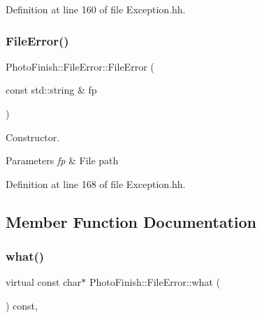 Definition at line 160 of file Exception.\+hh.

\mbox{\label{class_photo_finish_1_1_file_error_a4646f633f8b6383a52147cedacf3cf1d}} 
\subsubsection{\texorpdfstring{File\+Error()}{FileError()}\hspace{0.1cm}{\footnotesize\ttfamily [2/2]}}
{\footnotesize\ttfamily Photo\+Finish\+::\+File\+Error\+::\+File\+Error (\begin{DoxyParamCaption}\item[{const std\+::string \&}]{fp }\end{DoxyParamCaption})\hspace{0.3cm}{\ttfamily [inline]}}



Constructor. 


\begin{DoxyParams}{Parameters}
{\em fp} & File path \\
\hline
\end{DoxyParams}


Definition at line 168 of file Exception.\+hh.



\subsection{Member Function Documentation}
\mbox{\label{class_photo_finish_1_1_file_error_ac4da80387c770aa95858dae8aac9a81e}} 
\subsubsection{\texorpdfstring{what()}{what()}}
{\footnotesize\ttfamily virtual const char$\ast$ Photo\+Finish\+::\+File\+Error\+::what (\begin{DoxyParamCaption}{ }\end{DoxyParamCaption}) const\hspace{0.3cm}{\ttfamily [pure virtual]}, {\ttfamily [noexcept]}}



